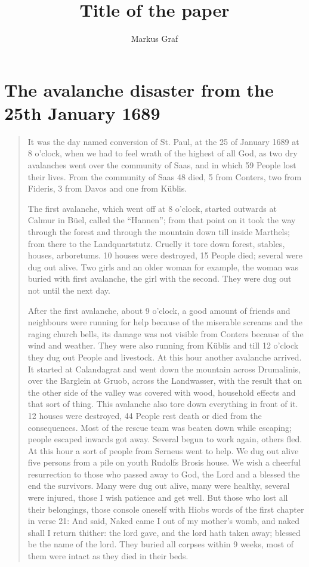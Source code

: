 \documentclass[12pt, a4paper]{article}
\title{Title of the paper}%
\author{Markus Graf}
\begin{document}
\maketitle
\section*{The avalanche disaster from the 25th January 1689}

\begin{quote}
 It was the day named  conversion of St. Paul, at the 25 of January 1689 at 8 o'clock, when we had to feel wrath of the highest of all God, as two dry avalanches went over the community of Saas, and in which 59 People lost their lives. From the community of Saas 48 died, 5 from Conters, two from Fideris, 3 from Davos and one from Küblis.
 
The first avalanche, which went off at 8 o'clock, started outwards at Calmur in Büel, called the ``Hannen''; from that point on it took the way through the forest and through the mountain down till inside Marthels; from there to the Landquartstutz. Cruelly it tore down   forest, stables, houses, arboretums. 10 houses were destroyed, 15 People died; several were dug out alive. Two girls and an older woman for example, the woman was buried with first avalanche, the girl with the second. They were dug out not until the next day. 

After the first avalanche,  about 9 o'clock,  a good amount of friends  and neighbours were running for help because of the miserable screams and the raging church bells, its damage was not visible from Conters because of the wind and weather. They were also running from Küblis and till 12 o'clock they dug out People and livestock. At this hour another avalanche arrived. It started at Calandagrat and went down the mountain across Drumalinis, over the Barglein at Gruob, across the Landwasser, with the result that on the other side of the valley was covered with wood, 	household effects and that sort of thing. This avalanche also tore down everything in front of it. 12 houses  were destroyed, 44 People rest death or died from the consequences. Most of the rescue team was beaten down while escaping; people escaped inwards got away. Several begun to work again, others fled. At this hour a sort of people from Serneus went to help. We dug out alive five persons from a pile on youth Rudolfs Brosis house. We wish a cheerful resurrection to those who passed away to God, the Lord and a blessed the end the survivors. Many were dug out alive, many were healthy, several were injured, those I wish patience and get well. But those who lost all their belongings, those console oneself with Hiobs words of the first chapter in verse 21: And said, Naked came I out of my mother's womb, and naked shall I return thither: the lord gave, and the lord hath taken away; blessed be the name of the lord. They buried all corpses within 9 weeks, most of them were intact as they died in their beds. 


\end{quote}
\end{document}
